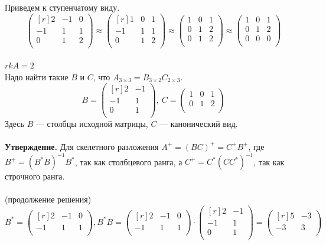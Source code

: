 \documentclass[12pt]{article}
\theoremstyle{definition}
\numberwithin{equation}{section}
\begin{document}
Приведем к ступенчатому виду.\\
\[\begin{pmatrix}[r]
2 & -1 & 0 \\         
-1 & 1 & 1 \\
0 & 1 & 2 \\
\end{pmatrix} \approx \begin{pmatrix}[r]
1 & 0 & 1 \\         
-1 & 1 & 1\\
0 & 1 & 2\\
\end{pmatrix} \approx \begin{pmatrix}
1 & 0 & 1 \\         
0 & 1 & 2 \\
0 & 1 & 2 \\
\end{pmatrix} \approx \begin{pmatrix}
1 & 0 & 1 \\         
0 & 1 & 2 \\
0 & 0 & 0 \\
\end{pmatrix}\]\\
$rkA=2$\\
Надо найти такие $B$ и $C$, что $A_{3 \times 3}=B_{3 \times 2}C_{2 \times 3}$.
\[B = \begin{pmatrix}[r]
2 & -1 \\         
-1 & 1 \\
0 & 1 \\
\end{pmatrix}, ~ C = \begin{pmatrix}
1 & 0 & 1 \\         
0 & 1 & 2 \\
\end{pmatrix}\]
Здесь $B$ --- столбцы исходной матрицы, $C$ --- канонический вид.\\ \\
\textbf{Утверждение.}
Для скелетного разложения $A^+=(BC)^+=C^+B^+$, где 
$B^+=(B^*B)^{-1}B^*$, так как столбцевого ранга, а
$C^+=C^*(CC^*)^{-1}$, так как строчного ранга.\\ \\
(продолжение решения)
\[B^* = \begin{pmatrix}[r]
2 & -1 & 0 \\         
-1 & 1 & 1 \\
\end{pmatrix}, B^*B = \begin{pmatrix}[r]
2 & -1 & 0 \\         
-1 & 1 & 1 \\
\end{pmatrix} \cdot \begin{pmatrix}[r]
2 & -1 \\         
-1 & 1 \\
0 & 1 \\
\end{pmatrix} = \begin{pmatrix}[r]
5 & -3 \\         
-3 & 3 \\
\end{pmatrix}\]\\
\end{document}
